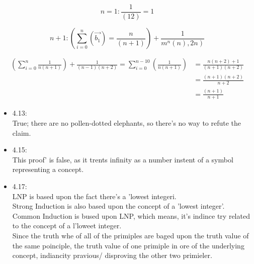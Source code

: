 \documentclass[10pt]{article}
\begin{document}
$$
n=1: \frac{1}{(12)}=1
$$

$$
n+1:\left(\sum_{i=0}^{n}\left(\overrightarrow{b_{1}}\right)=\frac{n}{(n+1)}\right)+\frac{1}{\left.m^{n}(n), 2 n\right)}
$$

$$
\begin{aligned}
\left(\sum_{i=0}^{n} \frac{1}{n(n+1)}\right)+\frac{1}{(n-1)(n+2)}=\sum_{i=0}^{n-10}\left(\frac{1}{n(n+1)}\right) & =\frac{n(n+2)+1}{(n+1)(n+2)} \\
& =\frac{(n+1)(n+2)}{n+2} \\
& =\frac{(n+1)}{n+1}
\end{aligned}
$$

\begin{itemize}
  \item[] 4.13:\\
True; there are no pollen-dotted elephants, so there's no way to refute the claim.
  \item[] 4.15:\\
This proof' is false, as it trents infinity as a number instent of a symbol representing a concept.
  \item[] 4.17:\\
LNP is based upon the fact there's a 'lowest integeri.\\
Strong Induction is also based upon the concept of a 'lowest integer'.\\
Common Induction is bused upon LNP, which means, it's indince try related to the concept of a l'loweet integer.\\
Since the truth whe of all of the primiples are baged upon the truth value of the same poinciple, the truth value of one primiple in ore of the underlying concept, indiancity pravious/ disproving the other two primieler.
\end{itemize}
\end{document}
